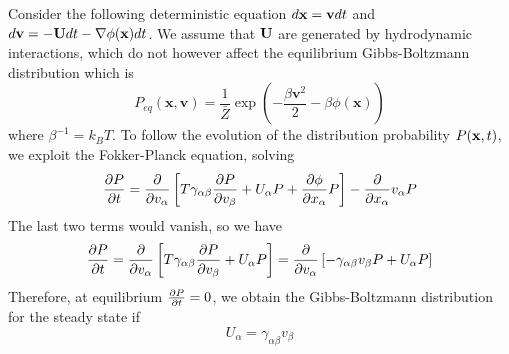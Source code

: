 \documentclass[fleqn,10pt]{InternshipReport-ENS-PSL}
\begin{document}
Consider the following deterministic equation
$ d \bbf{x} = \bbf{v} dt $
and $ d \bbf{v} = - \bbf{U} dt - \bbf{\nabla} \phi(\mathbf{x}) dt $.
We assume that $\bbf{U}$ are generated by hydrodynamic interactions, which do not however affect the equilibrium Gibbs-Boltzmann distribution which is 
$$ P_{eq} (\mathbf{x},\mathbf{v}) = \frac{1}{\bar{Z}} \exp \left( - \frac{\beta \mathbf{v}^2}{2} - \beta \phi(\mathbf{x}) \right) $$
where $\beta^{-1} = k_B T$. %
To follow the evolution of the distribution probability $P(\bbf{x},t)$, we exploit the Fokker-Planck equation, solving %
$$ \pder[P]{t} = \pder{v_\alpha} \left[ T \gamma_{\alpha\beta} \pder[P]{v_\beta} + U_\alpha P + \pder[\phi]{x_\alpha} P \right] - \pder{x_\alpha} v_\alpha P $$
The last two terms would vanish, %
so we have
$$ \pder[P]{t} = \pder{v_\alpha} \left[ T \gamma_{\alpha\beta} \pder[P]{v_\beta} + U_\alpha P \right] = \pder{v_\alpha} \left[ - \gamma_{\alpha\beta} v_\beta P + U_\alpha P \right] $$
Therefore, at equilibrium $\pder[P]{t} = 0$, we obtain the Gibbs-Boltzmann distribution for the steady state if 
$$ U_\alpha = \gamma_{\alpha\beta} v_\beta $$
\end{document}
